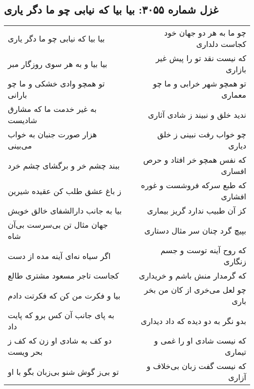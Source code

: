 \begin{center}
\section*{غزل شماره ۳۰۵۵: بیا بیا که نیابی چو ما دگر یاری}
\label{sec:3055}
\begin{longtable}{l p{0.5cm} r}
بیا بیا که نیابی چو ما دگر یاری
&&
چو ما به هر دو جهان خود کجاست دلداری
\\
بیا بیا و به هر سوی روزگار مبر
&&
که نیست نقد تو را پیش غیر بازاری
\\
تو همچو وادی خشکی و ما چو بارانی
&&
تو همچو شهر خرابی و ما چو معماری
\\
به غیر خدمت ما که مشارق شادیست
&&
ندید خلق و نبیند ز شادی آثاری
\\
هزار صورت جنبان به خواب می‌بینی
&&
چو خواب رفت نبینی ز خلق دیاری
\\
ببند چشم خر و برگشای چشم خرد
&&
که نفس همچو خر افتاد و حرص افساری
\\
ز باغ عشق طلب کن عقیده شیرین
&&
که طبع سرکه فروشست و غوره افشاری
\\
بیا به جانب دارالشفای خالق خویش
&&
کز آن طبیب ندارد گریز بیماری
\\
جهان مثال تن بی‌سرست بی‌آن شاه
&&
بپیچ گرد چنان سر مثال دستاری
\\
اگر سیاه نه‌ای آینه مده از دست
&&
که روح آینه توست و جسم زنگاری
\\
کجاست تاجر مسعود مشتری طالع
&&
که گرمدار منش باشم و خریداری
\\
بیا و فکرت من کن که فکرتت دادم
&&
چو لعل می‌خری از کان من بخر باری
\\
به پای جانب آن کس برو که پایت داد
&&
بدو نگر به دو دیده که داد دیداری
\\
دو کف به شادی او زن که کف ز بحر ویست
&&
که نیست شادی او را غمی و تیماری
\\
تو بی‌ز گوش شنو بی‌زبان بگو با او
&&
که نیست گفت زبان بی‌خلاف و آزاری
\\
\end{longtable}
\end{center}
